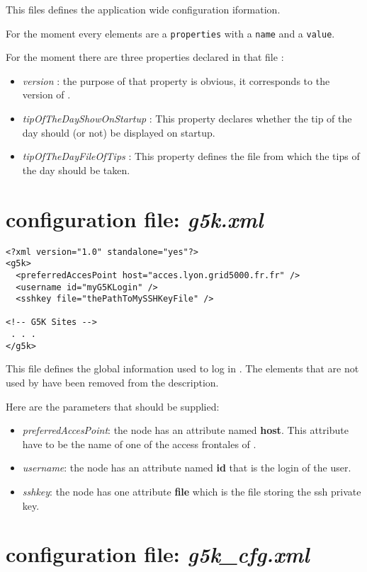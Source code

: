 This files defines the application wide configuration iformation. 

For the moment every elements are a \texttt{properties} with a \texttt{name} and
a \texttt{value}.

For the moment there are three properties declared in that file :
\begin{itemize}
  \item \textit{version} : the purpose of that property is obvious, it
  corresponds to the version of \grudu.
  \item \textit{tipOfTheDayShowOnStartup} : This property declares whether the
  tip of the day should (or not) be displayed on startup.
  \item \textit{tipOfTheDayFileOfTips} : This property defines the file from
  which the tips of the day should be taken.
\end{itemize}

\section{\gfk configuration file: \textit{g5k.xml}}

\begin{verbatim}
<?xml version="1.0" standalone="yes"?>
<g5k>
  <preferredAccesPoint host="acces.lyon.grid5000.fr.fr" />
  <username id="myG5KLogin" />
  <sshkey file="thePathToMySSHKeyFile" />

<!-- G5K Sites -->
 . . .
</g5k>

\end{verbatim}

This file defines the global information used to log in \gfk. The elements that
are not used by \grudu have been removed from the description.

Here are the parameters that should be supplied:

\begin{itemize}
  \item \textit{preferredAccesPoint}: the node has an attribute named
  \textbf{host}. This attribute have to be the name of one of the access
  frontales of \gfk.
  \item \textit{username}: the node has an attribute named \textbf{id} that is
  the login of the user.
  \item \textit{sshkey}: the node has one attribute \textbf{file} which is the
  file storing the ssh private key.
\end{itemize}

\section{\gfk configuration file: \textit{g5k\_cfg.xml}}

